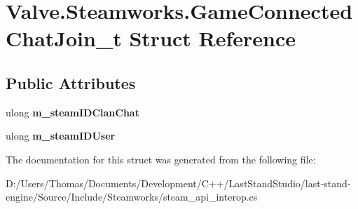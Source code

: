 \hypertarget{structValve_1_1Steamworks_1_1GameConnectedChatJoin__t}{}\section{Valve.\+Steamworks.\+Game\+Connected\+Chat\+Join\+\_\+t Struct Reference}
\label{structValve_1_1Steamworks_1_1GameConnectedChatJoin__t}
\subsection*{Public Attributes}
\begin{DoxyCompactItemize}
\item 
\hypertarget{structValve_1_1Steamworks_1_1GameConnectedChatJoin__t_aa4c0708a76d2aee453b90e6c962b2bea}{}ulong {\bfseries m\+\_\+steam\+I\+D\+Clan\+Chat}\label{structValve_1_1Steamworks_1_1GameConnectedChatJoin__t_aa4c0708a76d2aee453b90e6c962b2bea}

\item 
\hypertarget{structValve_1_1Steamworks_1_1GameConnectedChatJoin__t_ad0983d78aca19196d4a2e8c154d6d635}{}ulong {\bfseries m\+\_\+steam\+I\+D\+User}\label{structValve_1_1Steamworks_1_1GameConnectedChatJoin__t_ad0983d78aca19196d4a2e8c154d6d635}

\end{DoxyCompactItemize}


The documentation for this struct was generated from the following file\+:\begin{DoxyCompactItemize}
\item 
D\+:/\+Users/\+Thomas/\+Documents/\+Development/\+C++/\+Last\+Stand\+Studio/last-\/stand-\/engine/\+Source/\+Include/\+Steamworks/steam\+\_\+api\+\_\+interop.\+cs\end{DoxyCompactItemize}
